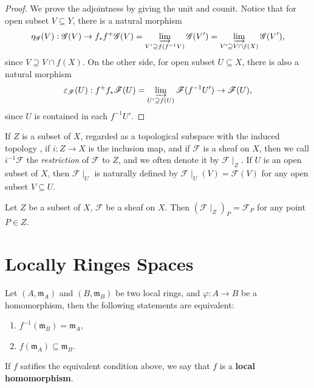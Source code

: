 \documentclass[11pt]{article}
\begin{document}
\begin{proof}
  We prove the adjointness by giving the unit and counit. 
  Notice that for open subset $ V \subseteq Y $, there is a natural morphism 
  $$\eta_{\mathscr{G}}(V): \mathscr{G}(V) \to f_{*}f^{+}\mathscr{G}(V)=\varinjlim_{V' \supseteq f(f^{-1}V)} \mathscr{G}(V')
  = \varinjlim_{V' \supseteq V \cap f(X)} \mathscr{G}(V'), $$
  since $ V \supseteq V \cap f(X)$. On the other side, for open subset $ U \subseteq X $, there is also a natural morphism 
  $$ \varepsilon_{\mathscr{F}}(U): f^{+}f_{*}\mathscr{F}(U)=
  \varinjlim_{U' \supseteq f(U)}\mathscr{F}(f^{-1}U') \to \mathscr{F}(U), $$
  since $ U $ is contained in each $ f^{-1}U' $.  
\end{proof}




\begin{definition}
  If $Z$ is a subset of $X$, regarded as a topological subspace with the induced topology
  , if $i: Z \to  X$ is the inclusion map, and if $\mathscr{F}$ is a sheaf on $X$, 
  then we call $i^{-1}\mathscr{F}$ the \emph{restriction} of $\mathscr{F}$ to $Z$, 
  and we often denote it by $\mathscr{F}\mid_{Z}$. 
  If $ U $ is an open subset of $ X $, then $ \mathscr{F}\mid_{U} $ is 
  naturally defined by $ \mathscr{F}\mid_{U}(V) = \mathscr{F}(V) $ for any open subset 
  $ V \subseteq U $. 
\end{definition}

\begin{corollary}
  Let $ Z $ be a subset of $ X $, $ \mathscr{F} $ be a sheaf on $ X $. 
  Then $ (\mathscr{F}\mid_{Z})_{P} = \mathscr{F}_{P} $ for any point $ P \in Z $. 
\end{corollary}

\begin{example}[Skyscraper]
  \cite[Exercise II.1.17]{hartsAG}
  
\end{example}


\section{Locally Ringes Spaces}

\begin{lemma}
  \label{lemma: local homomorphism}
  Let $ (A, \mathfrak{m}_{A}) $ and $ (B,\mathfrak{m}_{B}) $ be two local rings, 
  and $ \varphi : A \to B $ be a homomorphism, then the following statements are equivalent: 
  \begin{enumerate}[label = (\alph*)]
    \item $ f^{-1}(\mathfrak{m}_{B}) = \mathfrak{m}_{A} $, 
    \item $ f(\mathfrak{m}_{A}) \subseteq \mathfrak{m}_{B} $.  
  \end{enumerate} 
  If $ f $ satifies the equivalent condition above, we say that $ f $ is a \textbf{local homomorphism}. 
\end{lemma}
\end{document}
